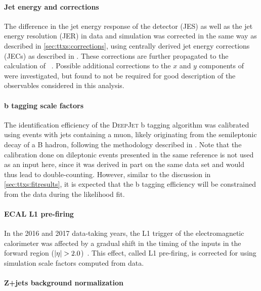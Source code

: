 \paragraph{Jet energy and \ptmiss corrections}

The difference in the jet energy response of the detector (JES) as well as the jet energy resolution (JER) in data and simulation was corrected in the same way as described in \cref{sec:ttxs:corrections}, using centrally derived jet energy corrections (JECs) as described in . These corrections are further propagated to the calculation of \ptmissvec~\cite{CMS:JME-17-001}. Possible additional corrections to the $x$ and $y$ components of \ptmissvec were investigated, but found to not be required for good description of the observables considered in this analysis. 

\paragraph{b tagging scale factors}

The identification efficiency of the \textsc{DeepJet} b tagging algorithm was calibrated using events with jets containing a muon, likely originating from the semileptonic decay of a B hadron, following the methodology described in . Note that the calibration done on dileptonic \ttbar events presented in the same reference is not used as an input here, since it was derived in part on the same data set and would thus lead to double-counting. However, similar to the discussion in \cref{sec:ttxs:fitresults}, it is expected that the b tagging efficiency will be constrained from the data during the likelihood fit.

\paragraph{ECAL L1 pre-firing}

In the 2016 and 2017 data-taking years, the L1 trigger of the electromagnetic calorimeter was affected by a gradual shift in the timing of the inputs in the forward region ($|\eta| > 2.0$)~\cite{CMS:TRG-17-001}. This effect, called L1 pre-firing, is corrected for using simulation scale factors computed from data.

\paragraph{Z+jets background normalization}

